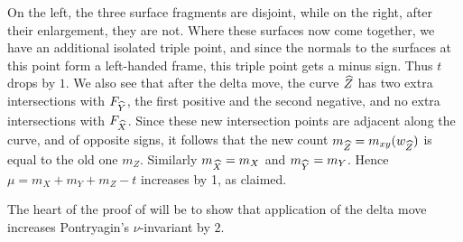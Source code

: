 \begin{example}
On the left, the three surface fragments are disjoint, while on the right, after their enlargement, they are not.  Where these surfaces now come together, we have an additional isolated triple point, and since the normals to the surfaces at this point form a left-handed frame, this triple point gets a minus sign.  Thus $t$ drops by $1$.   We also see that after the delta move, the curve $\widehat{Z}$ has two extra intersections with $F_{\widehat{Y}}$, the first positive and the second negative, and no extra intersections with $F_{\widehat{X}}$.  Since these new intersection points are adjacent along the curve, and of opposite signs,  it follows that the new count $m_{\widehat{Z}} =  m_{xy}(w_{\widehat{Z}})$ is equal to the old one $m_Z$.  Similarly $m_{\widehat{X}} = m_X$ and $m_{\widehat{Y}} = m_Y$.   Hence $\mu =  m_X + m_Y + m_Z  - t$  increases by 1,  as claimed. 
 
The heart of the proof of  will be to show that application of the delta move increases Pontryagin's $\nu$-invariant by $2$. 

\end{example}

 
